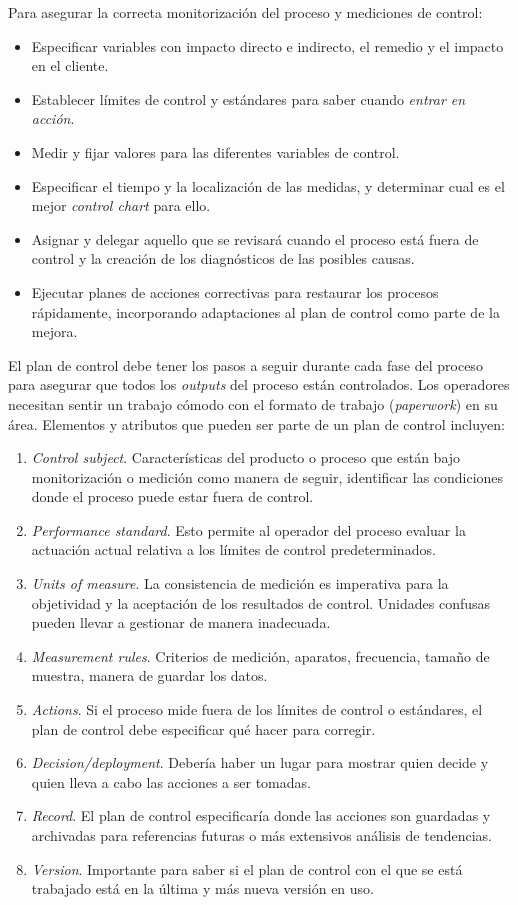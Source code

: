 \documentclass[oneside]{book}
\begin{document}
Para asegurar la correcta monitorización del proceso y mediciones de control:
\begin{itemize}
	\item Especificar variables con impacto directo e indirecto, el remedio y el impacto en el cliente.
	\item Establecer límites de control y estándares para saber cuando \textit{entrar en acción}.
	\item Medir y fijar valores para las diferentes variables de control.
	\item Especificar el tiempo y la localización de las medidas, y determinar cual es el mejor \textit{control chart} para ello.
	\item Asignar y delegar aquello que se revisará cuando el proceso está fuera de control y la creación de los diagnósticos de las posibles causas.
	\item Ejecutar planes de acciones correctivas para restaurar los procesos rápidamente, incorporando adaptaciones al plan de control como parte de la mejora.
\end{itemize}

El plan de control debe tener los pasos a seguir durante cada fase del proceso para asegurar que todos los \textit{outputs} del proceso están controlados. Los operadores necesitan sentir un trabajo cómodo con el formato de trabajo (\textit{paperwork}) en su área. Elementos y atributos que pueden ser parte de un plan de control incluyen:
\begin{enumerate}
	\item \textit{Control subject}. Características del producto o proceso que están bajo monitorización o medición como manera de seguir, identificar las condiciones donde el proceso puede estar fuera de control.
	\item \textit{Performance standard}. Esto permite al operador del proceso evaluar la actuación actual relativa a los límites de control predeterminados.
	\item \textit{Units of measure}. La consistencia de medición es imperativa para la objetividad y la aceptación de los resultados de control. Unidades confusas pueden llevar a gestionar de manera inadecuada.
	\item \textit{Measurement rules}. Criterios de medición, aparatos, frecuencia, tamaño de muestra, manera de guardar los datos.
	\item \textit{Actions}. Si el proceso mide fuera de los límites de control o estándares, el plan de control debe especificar qué hacer para corregir.
	\item \textit{Decision/deployment}. Debería haber un lugar para mostrar quien decide y quien lleva a cabo las acciones a ser tomadas.
	\item \textit{Record}. El plan de control especificaría donde las acciones son guardadas y archivadas para referencias futuras o más extensivos análisis de tendencias.
	\item \textit{Version}. Importante para saber si el plan de control con el que se está trabajado está en la última y más nueva versión en uso.
\end{enumerate}
\end{document}

